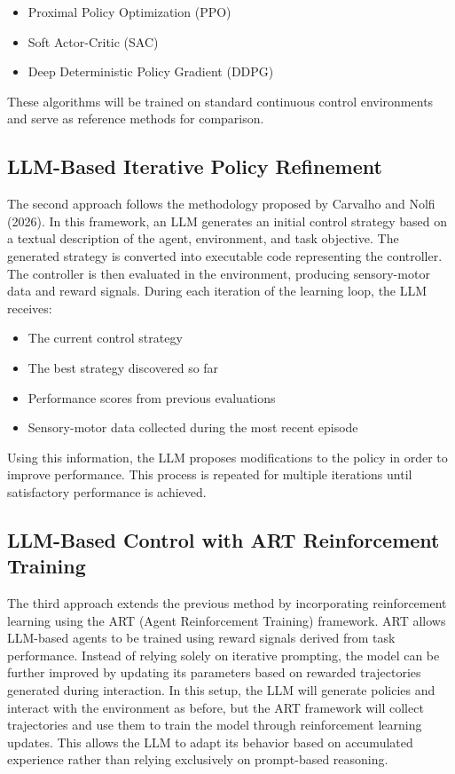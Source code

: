 \documentclass[12pt]{article}
\begin{document}
\begin{itemize}
\item Proximal Policy Optimization (PPO)
\item Soft Actor-Critic (SAC)
\item Deep Deterministic Policy Gradient (DDPG)
\end{itemize}

These algorithms will be trained on standard continuous control environments and serve as reference methods for comparison.

\subsection{LLM-Based Iterative Policy Refinement}

The second approach follows the methodology proposed by Carvalho and Nolfi (2026). In this framework, an LLM generates an initial control strategy based on a textual description of the agent, environment, and task objective. The generated strategy is converted into executable code representing the controller. The controller is then evaluated in the environment, producing sensory-motor data and reward signals. During each iteration of the learning loop, the LLM receives:

\begin{itemize}
\item The current control strategy
\item The best strategy discovered so far
\item Performance scores from previous evaluations
\item Sensory-motor data collected during the most recent episode
\end{itemize}

Using this information, the LLM proposes modifications to the policy in order to improve performance. This process is repeated for multiple iterations until satisfactory performance is achieved.

\subsection{LLM-Based Control with ART Reinforcement Training}

The third approach extends the previous method by incorporating reinforcement learning using the ART (Agent Reinforcement Training) framework. ART allows LLM-based agents to be trained using reward signals derived from task performance. Instead of relying solely on iterative prompting, the model can be further improved by updating its parameters based on rewarded trajectories generated during interaction. In this setup, the LLM will generate policies and interact with the environment as before, but the ART framework will collect trajectories and use them to train the model through reinforcement learning updates. This allows the LLM to adapt its behavior based on accumulated experience rather than relying exclusively on prompt-based reasoning.
\end{document}

